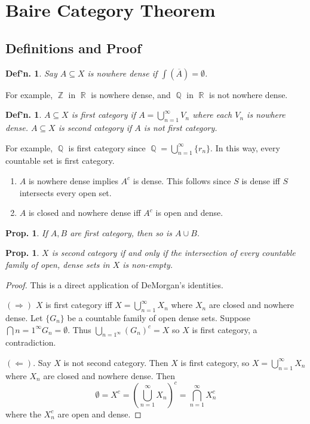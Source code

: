 \documentclass[12pt, a4paper]{book}
\DeclareMathOperator{\Q}{\mathbb{Q}}
\DeclareMathOperator{\Z}{\mathbb{Z}}
\DeclareMathOperator{\R}{\mathbb{R}}
\newtheorem{definition}[theorem]{Def'n.}
\newtheorem{proposition}[theorem]{Prop.}
\theoremstyle{nonumberplain}
\newtheorem{proof}{Proof}
\begin{document}
\section{Baire Category Theorem}
\subsection{Definitions and Proof}
\begin{definition}
    Say $A\subseteq X$ is nowhere dense if $\int(\overline{A})=\emptyset$.
\end{definition}
For example, $\Z$ in $\R$ is nowhere dense, and $\Q$ in $\R$ is not nowhere dense.
\begin{definition}
    $A\subseteq X$ is \textit{first category} if $A=\bigcup\limits_{n=1}^\infty V_n$ where each $V_n$ is nowhere dense.
    $A\subseteq X$ is \textit{second category} if $A$ is not first category.
\end{definition}
For example, $\Q$ is first category since $\Q=\bigcup_{n=1}^\infty\{r_n\}$.
In this way, every countable set is first category.
\begin{enumerate}
    \item $A$ is nowhere dense implies $A^c$ is dense.
        This follows since $S$ is dense iff $S$ intersects every open set.
    \item $A$ is closed and nowhere dense iff $A^c$ is open and dense.
\end{enumerate}
\begin{proposition}
    If $A,B$ are first category, then so is $A\cup B$.
\end{proposition}
\begin{proposition}
    $X$ is second category if and only if the intersection of every countable family of open, dense sets in $X$ is non-empty.
\end{proposition}
\begin{proof}
    This is a direct application of DeMorgan's identities.

    $(\Rightarrow)$ $X$ is first category iff $X=\bigcup_{n=1}^\infty X_n$ where $X_n$ are closed and nowhere dense.
    Let $\{G_n\}$ be a countable family of open dense sets.
    Suppose $\bigcap{n=1}^\infty G_n=\emptyset$.
    Thus $\bigcup_{n=1^\infty}(G_n)^c=X$ so $X$ is first category, a contradiction.

    $(\Leftarrow)$. Say $X$ is not second category.
    Then $X$ is first category, so $X=\bigcup_{n=1}^\infty X_n$ where $X_n$ are closed and nowhere dense.
    Then
    \[\emptyset=X^c=\left(\bigcup_{n=1}^\infty X_n\right)^c=\bigcap_{n=1}^\infty X_n^c\]
    where the $X_n^c$ are open and dense.
\end{proof}
\end{document}
